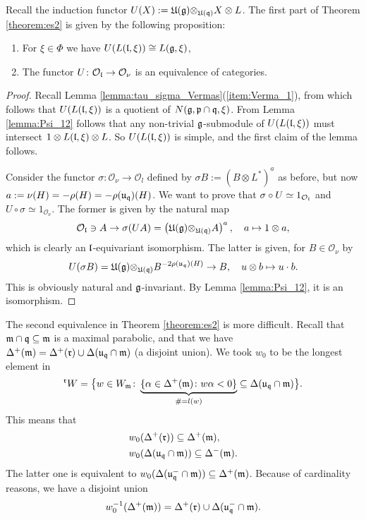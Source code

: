 \documentclass[a4paper,10pt]{article}
\begin{document}
Recall the induction functor $U(X) := \mathfrak{U(g)\otimes_{U(q)}} X \otimes L$. The first part of Theorem \ref{theorem:es2} is given by the following proposition:
%
\begin{proposition}
\begin{enumerate}
\item For $\xi \in \Phi$ we have $U(L(\mathfrak{l},\xi)) \cong L(\mathfrak{g},\xi)$,
\item The functor $U \colon \mathcal{O}_{\mathfrak{l}} \to \mathcal{O}_\nu$ is an equivalence of categories.
\end{enumerate}
\end{proposition}
%
\begin{proof}
Recall Lemma \ref{lemma:tau_sigma_Vermas}(\ref{item:Verma_1}), from which follows that $U(L(\mathfrak{l},\xi))$ is a quotient of $N(\mathfrak{g,p\cap q},\xi)$. From Lemma \ref{lemma:Psi_12} follows that any non-trivial $\mathfrak{g}$-submodule of $U(L(\mathfrak{l},\xi))$  must intersect $1 \otimes L(\mathfrak{l},\xi) \otimes L$. So $U(L(\mathfrak{l},\xi))$ is simple, and the first claim of the lemma follows.

Consider the functor $\sigma \colon \mathcal{O}_\nu \to \mathcal{O}_l$ defined by $\sigma B := \left(B \otimes L^\ast \right)^a$ as before, but now $a:= \nu(H) = - \rho(H) = - \rho(\mathfrak{u_q})(H)$. We want to prove that $\sigma \circ U \simeq 1_{\mathcal{O}_{\mathfrak{l}}}$ and $U \circ \sigma  \simeq 1_{\mathcal{O}_{\nu}}$. The former is given by the natural map
%
\[ \mathcal{O}_{\mathfrak{l}} \ni A \to \sigma(UA) = \left( \mathfrak{U(g) \otimes_{U(q)}} A \right)^{a}, \quad a \mapsto 1 \otimes a, \]
%
which is clearly an $\mathfrak{l}$-equivariant isomorphism. The latter is given, for $B \in \mathcal{O}_\nu$ by
%
\[ U(\sigma B) = \mathfrak{U(g) \otimes_{U(q)}} B^{-2 \rho(\mathfrak{u_q})(H)} \to B, \quad u \otimes b \mapsto u \cdot b. \]
%
This is obviously natural and $\mathfrak{g}$-invariant. By Lemma \ref{lemma:Psi_12},  it is an isomorphism.
\end{proof}

The second equivalence in Theorem \ref{theorem:es2} is more difficult. Recall that $\mathfrak{m \cap q \subseteq m}$ is a maximal parabolic, and that we have $\Delta^+(\mathfrak{m}) = \Delta^+(\mathfrak{r}) \cup \Delta(\mathfrak{u_q \cap m})$ (a disjoint union). We took $w_0$ to be the longest element in
%
\[  {}^{\mathfrak{r}} W = \big\{ w \in W_{\mathfrak{m}} \colon \underbrace{\{ \alpha \in \Delta^+(\mathfrak{m}) \colon w \alpha <0 \}}_{\# = l(w)} \subseteq \Delta(\mathfrak{u_q \cap m}) \big\}. \]
%
This means that
%
\begin{align*}
& w_0 (\Delta^+(\mathfrak{r})) \subseteq \Delta^+(\mathfrak{m}), \\
& w_0 (\Delta(\mathfrak{u_q \cap m})) \subseteq \Delta^-(\mathfrak{m}).
\end{align*}
%
The latter one is equivalent to $w_0 (\Delta(\mathfrak{u_q^- \cap m})) \subseteq \Delta^+(\mathfrak{m})$. Because of cardinality reasons, we have a disjoint union
%
\begin{equation}
\label{equation:w_0_inverse}
w_0^{-1} (\Delta^+(\mathfrak{m}))  = \Delta^+(\mathfrak{r}) \cup \Delta(\mathfrak{u_q^- \cap m}).
\end{equation}
%
\end{document}
